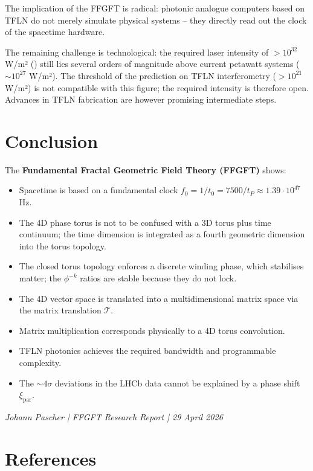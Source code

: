 	The implication of the FFGFT is radical: photonic analogue computers based on TFLN do not merely simulate physical systems -- they directly read out the clock of the spacetime hardware.
	
	The remaining challenge is technological: the required laser intensity of $>10^{32}$ W/m² (\cite{subPlanck2025}) still lies several orders of magnitude above current petawatt systems ($\sim 10^{27}$ W/m²). The threshold of the prediction on TFLN interferometry ($>10^{21}$ W/m²) is not compatible with this figure; the required intensity is therefore open. Advances in TFLN fabrication are however promising intermediate steps.
	
	\section{Conclusion}
	
	The \textbf{Fundamental Fractal Geometric Field Theory (FFGFT)} shows:
	
	\begin{itemize}
		\item Spacetime is based on a fundamental clock $f_0 = 1/t_0 = 7500/t_P \approx 1.39 \cdot 10^{47}$ Hz.
		\item The 4D phase torus is not to be confused with a 3D torus plus time continuum; the time dimension is integrated as a fourth geometric dimension into the torus topology.
		\item The closed torus topology enforces a discrete winding phase, which stabilises matter; the $\phi^{-k}$ ratios are stable because they do not lock.
		\item The 4D vector space is translated into a multidimensional matrix space via the matrix translation $\mathcal{T}$.
		\item Matrix multiplication corresponds physically to a 4D torus convolution.
		\item TFLN photonics achieves the required bandwidth and programmable complexity.
		\item The $\sim 4\sigma$ deviations in the LHCb data cannot be explained by a phase shift $\xi_{\text{par}}$.
	\end{itemize}
	
	\vspace{2cm}
	\begin{center}
		\small \textit{Johann Pascher | FFGFT Research Report | 29 April 2026}
	\end{center}
	
	\newpage
	\section*{References}
	

